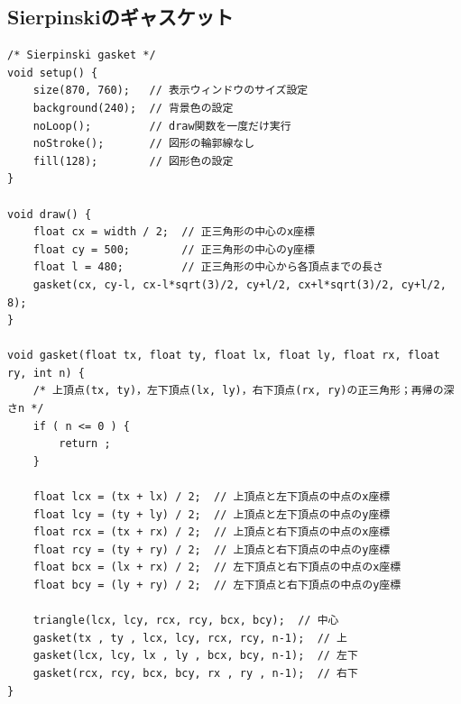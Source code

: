\documentclass[dvipdfmx]{jsarticle}
\theoremstyle{definition}
\begin{document}
\subsection{Sierpinskiのギャスケット}  \label{subsec_code_gasket}
\begin{lstlisting}[caption=Sierpinskiのギャスケット, label=code_gasket_all]
/* Sierpinski gasket */
void setup() {
    size(870, 760);   // 表示ウィンドウのサイズ設定
    background(240);  // 背景色の設定
    noLoop();         // draw関数を一度だけ実行
    noStroke();       // 図形の輪郭線なし
    fill(128);        // 図形色の設定
}

void draw() {
    float cx = width / 2;  // 正三角形の中心のx座標
    float cy = 500;        // 正三角形の中心のy座標
    float l = 480;         // 正三角形の中心から各頂点までの長さ
    gasket(cx, cy-l, cx-l*sqrt(3)/2, cy+l/2, cx+l*sqrt(3)/2, cy+l/2, 8);
}

void gasket(float tx, float ty, float lx, float ly, float rx, float ry, int n) {
    /* 上頂点(tx, ty)，左下頂点(lx, ly)，右下頂点(rx, ry)の正三角形；再帰の深さn */
    if ( n <= 0 ) {
        return ;
    }

    float lcx = (tx + lx) / 2;  // 上頂点と左下頂点の中点のx座標
    float lcy = (ty + ly) / 2;  // 上頂点と左下頂点の中点のy座標
    float rcx = (tx + rx) / 2;  // 上頂点と右下頂点の中点のx座標
    float rcy = (ty + ry) / 2;  // 上頂点と右下頂点の中点のy座標
    float bcx = (lx + rx) / 2;  // 左下頂点と右下頂点の中点のx座標
    float bcy = (ly + ry) / 2;  // 左下頂点と右下頂点の中点のy座標

    triangle(lcx, lcy, rcx, rcy, bcx, bcy);  // 中心
    gasket(tx , ty , lcx, lcy, rcx, rcy, n-1);  // 上
    gasket(lcx, lcy, lx , ly , bcx, bcy, n-1);  // 左下
    gasket(rcx, rcy, bcx, bcy, rx , ry , n-1);  // 右下
}
\end{lstlisting}
\clearpage

\end{document}
